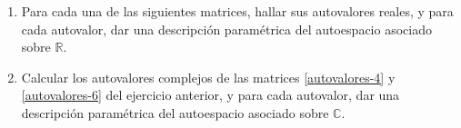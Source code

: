 \begin{enumerate}[topsep=6pt,itemsep=.4cm]

\item\label{autovalores} Para cada una de las siguientes matrices, hallar sus autovalores reales, y para cada autovalor, dar una descripción paramétrica del autoespacio asociado sobre $\mathbb{R}$.
    \begin{multicols}{2}
    \end{multicols}



\item\label{autovalores-complejos} Calcular los autovalores complejos de las matrices \ref{autovalores-4} y \ref{autovalores-6} del ejercicio anterior, y para cada autovalor, dar una descripción paramétrica del autoespacio asociado sobre $\mathbb{C}$.

\end{enumerate}

